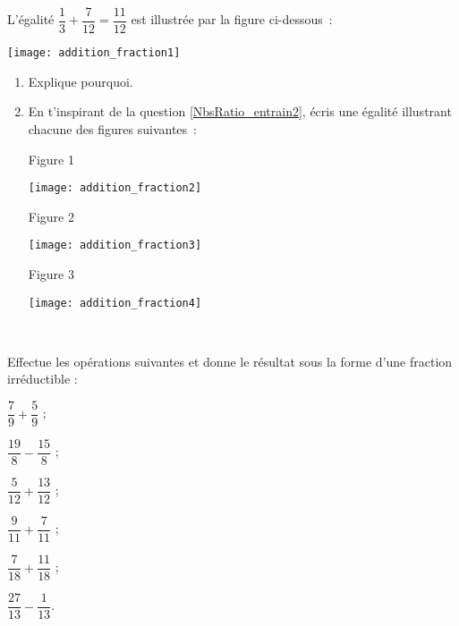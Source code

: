 

\begin{exercice}
L'égalité $\dfrac{1}{3} + \dfrac{7}{12} = \dfrac{11}{12}$ est illustrée par la figure ci-dessous :
\begin{center} \texttt{[image: addition\_fraction1]} \end{center}
\begin{enumerate}
 \item Explique pourquoi. \label{NbsRatio_entrain2}
 \item En t'inspirant de la question \ref{NbsRatio_entrain2}, écris une égalité illustrant chacune des figures suivantes :
 
 \begin{minipage}[t]{0.28\linewidth}
 \begin{center} Figure 1 \end{center}
 \begin{center} \texttt{[image: addition\_fraction2]} \end{center}
  \end{minipage} \hfill%
 \begin{minipage}[t]{0.38\linewidth}
 \begin{center} Figure 2 \end{center}
 \begin{center} \texttt{[image: addition\_fraction3]} \end{center}
  \end{minipage} \hfill%
 \begin{minipage}[t]{0.3\linewidth}
 \begin{center} Figure 3 \end{center}
 \begin{center} \texttt{[image: addition\_fraction4]} \end{center}
  \end{minipage} \\
 \end{enumerate}
\end{exercice}


\begin{exercice}
Effectue les opérations suivantes et donne le résultat sous la forme d'une fraction irréductible : \\[0.1em]
\begin{colenumerate}{3}
 \item $\dfrac{7}{9} + \dfrac{5}{9}$ ;
 \vspace{0.2cm}
 \item $\dfrac{19}{8} - \dfrac{15}{8}$ ;
 \item $\dfrac{5}{12} + \dfrac{13}{12}$ ;
 \item $\dfrac{9}{11} + \dfrac{7}{11}$ ;
 \item $\dfrac{7}{18} + \dfrac{11}{18}$ ;
  \item $\dfrac{27}{13} - \dfrac{1}{13}$.
 \end{colenumerate}
\end{exercice}


